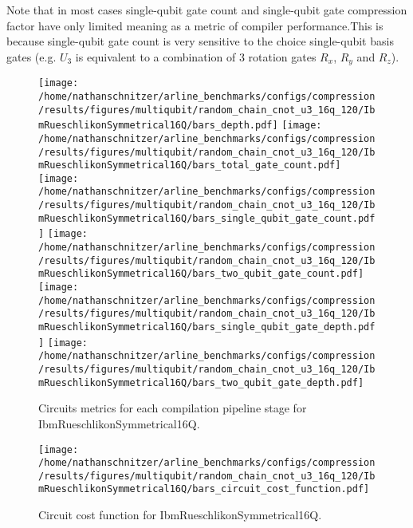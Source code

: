 \documentclass{report}%
\begin{document}
%
Note that in most cases single-qubit gate count and single-qubit gate compression factor
                have only limited meaning as a metric of compiler performance.This is because single-qubit
                gate count is very sensitive to the choice single-qubit basis gates (e.g. $U_3$ is
                equivalent to a combination of 3 rotation gates $R_x$, $R_y$ and $R_z$).%


\begin{figure}[h!]%
\centering%
\texttt{[image: /home/nathanschnitzer/arline\_benchmarks/configs/compression/results/figures/multiqubit/random\_chain\_cnot\_u3\_16q\_120/IbmRueschlikonSymmetrical16Q/bars\_depth.pdf]}%
\centering%
\texttt{[image: /home/nathanschnitzer/arline\_benchmarks/configs/compression/results/figures/multiqubit/random\_chain\_cnot\_u3\_16q\_120/IbmRueschlikonSymmetrical16Q/bars\_total\_gate\_count.pdf]}%
\linebreak%
\centering%
\texttt{[image: /home/nathanschnitzer/arline\_benchmarks/configs/compression/results/figures/multiqubit/random\_chain\_cnot\_u3\_16q\_120/IbmRueschlikonSymmetrical16Q/bars\_single\_qubit\_gate\_count.pdf]}%
\centering%
\texttt{[image: /home/nathanschnitzer/arline\_benchmarks/configs/compression/results/figures/multiqubit/random\_chain\_cnot\_u3\_16q\_120/IbmRueschlikonSymmetrical16Q/bars\_two\_qubit\_gate\_count.pdf]}%
\linebreak%
\centering%
\texttt{[image: /home/nathanschnitzer/arline\_benchmarks/configs/compression/results/figures/multiqubit/random\_chain\_cnot\_u3\_16q\_120/IbmRueschlikonSymmetrical16Q/bars\_single\_qubit\_gate\_depth.pdf]}%
\centering%
\texttt{[image: /home/nathanschnitzer/arline\_benchmarks/configs/compression/results/figures/multiqubit/random\_chain\_cnot\_u3\_16q\_120/IbmRueschlikonSymmetrical16Q/bars\_two\_qubit\_gate\_depth.pdf]}%
\linebreak%
\caption{Circuits metrics for each compilation pipeline stage for IbmRueschlikonSymmetrical16Q.}%
\end{figure}

%


\begin{figure}[h!]%
\centering%
\texttt{[image: /home/nathanschnitzer/arline\_benchmarks/configs/compression/results/figures/multiqubit/random\_chain\_cnot\_u3\_16q\_120/IbmRueschlikonSymmetrical16Q/bars\_circuit\_cost\_function.pdf]}%
\caption{Circuit cost function for IbmRueschlikonSymmetrical16Q.}%
\end{figure}
\end{document}
